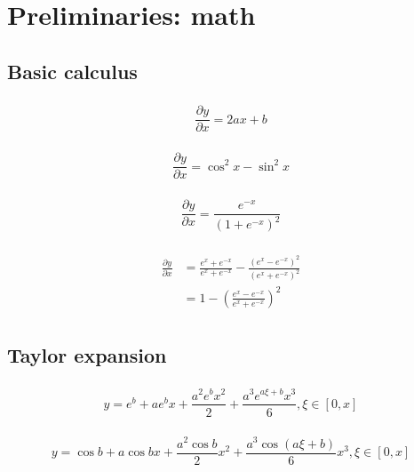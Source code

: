 \documentclass[11pt]{article}
\begin{document}
\section{Preliminaries: math} %
\subsection{Basic calculus} %
\subsubsection{} %
\[\frac{\partial y}{\partial x}=2ax+b\]


\subsubsection{} %
\[\frac{\partial y}{\partial x}=\cos^2x-\sin^2x\]


\subsubsection{} %
\[\frac{\partial y}{\partial x}=\frac{e^{-x}}{(1+e^{-x})^2}\]


\subsubsection{} %
\begin{align*}
	\frac{\partial y}{\partial x}
	&=\frac{e^x+e^{-x}}{e^x+e^{-x}}-\frac{(e^x-e^{-x})^2}{(e^x+e^{-x})^2}\\
	&=1-\left(\frac{e^x-e^{-x}}{e^x+e^{-x}}\right)^2\\
\end{align*}


\subsection{Taylor expansion} %
\subsubsection{} %
\[y=e^b+ae^bx+\frac{a^2e^bx^2}{2}+\frac{a^3e^{a\xi+b}x^3}{6},\xi\in[0,x]\]


\subsubsection{} %
\[y=\cos b+a\cos bx+\frac{a^2\cos b}{2}x^2+\frac{a^3\cos(a\xi+b)}{6}x^3,\xi\in[0,x]\]
\end{document}
